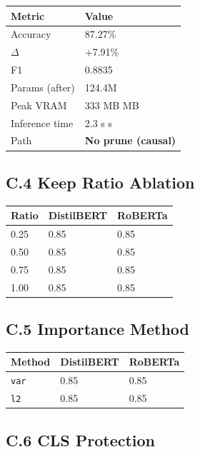 \begin{table}[H]
\centering
\small
\begin{tabular}{ll}
\toprule
\textbf{Metric} & \textbf{Value} \\
\midrule
Accuracy & 87.27\% \\
$\Delta$ & +7.91\% \\
F1 & 0.8835 \\
Params (after) & 124.4M \\
Peak VRAM & 333 MB MB \\
Inference time & 2.3 s s \\
Path & \textbf{No prune (causal)} \\
\bottomrule
\end{tabular}
\end{table}

\subsection{C.4 Keep Ratio Ablation}

\begin{table}[H]
\centering
\small
\begin{tabular}{lll}
\toprule
\textbf{Ratio} & \textbf{DistilBERT} & \textbf{RoBERTa} \\
\midrule
0.25 & 0.85 & 0.85 \\
0.50 & 0.85 & 0.85 \\
0.75 & 0.85 & 0.85 \\
1.00 & 0.85 & 0.85 \\
\bottomrule
\end{tabular}
\end{table}

\subsection{C.5 Importance Method}

\begin{table}[H]
\centering
\small
\begin{tabular}{lll}
\toprule
\textbf{Method} & \textbf{DistilBERT} & \textbf{RoBERTa} \\
\midrule
\texttt{var} & 0.85 & 0.85 \\
\texttt{l2} & 0.85 & 0.85 \\
\bottomrule
\end{tabular}
\end{table}

\subsection{C.6 CLS Protection}

